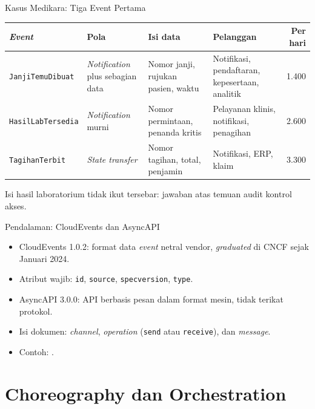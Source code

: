 \documentclass[aspectratio=169, table, 12pt]{beamer}
\begin{document}
\begin{frame}{{\Large Kasus Medikara: Tiga Event Pertama}}
  \scriptsize
  \begin{tabularx}{\textwidth}{>{\raggedright\arraybackslash}p{3.0cm}
      >{\raggedright\arraybackslash}p{2.3cm} >{\raggedright\arraybackslash}X
      >{\raggedright\arraybackslash}X r}
    \hline
    \textbf{\textit{Event}} & \textbf{Pola} & \textbf{Isi data}
      & \textbf{Pelanggan} & \textbf{Per hari} \\
    \hline
    \texttt{JanjiTemuDibuat} & \textit{Notification} plus sebagian data
      & Nomor janji, rujukan pasien, waktu & Notifikasi, pendaftaran,
      kepesertaan, analitik & 1.400 \\
    \hline
    \texttt{HasilLabTersedia} & \textit{Notification} murni
      & Nomor permintaan, penanda kritis & Pelayanan klinis, notifikasi,
      penagihan & 2.600 \\
    \hline
    \texttt{TagihanTerbit} & \textit{State transfer}
      & Nomor tagihan, total, penjamin & Notifikasi, ERP, klaim & 3.300 \\
    \hline
  \end{tabularx}

  \vspace{8pt}
  \small
  Isi hasil laboratorium tidak ikut tersebar: jawaban atas temuan audit
  kontrol akses.
\end{frame}

\begin{frame}{{\Large Pendalaman: CloudEvents dan AsyncAPI}}
  \vspace{6pt}
  \begin{itemize}
    \item CloudEvents 1.0.2: format data \textit{event} netral vendor,
          \textit{graduated} di CNCF sejak Januari 2024.
    \item Atribut wajib: \texttt{id}, \texttt{source}, \texttt{specversion},
          \texttt{type}.
    \item AsyncAPI 3.0.0: API berbasis pesan dalam format mesin, tidak terikat
          protokol.
    \item Isi dokumen: \textit{channel}, \textit{operation} (\texttt{send} atau
          \texttt{receive}), dan \textit{message}.
    \item Contoh: .
  \end{itemize}
\end{frame}

\section{Choreography dan Orchestration}
\end{document}

